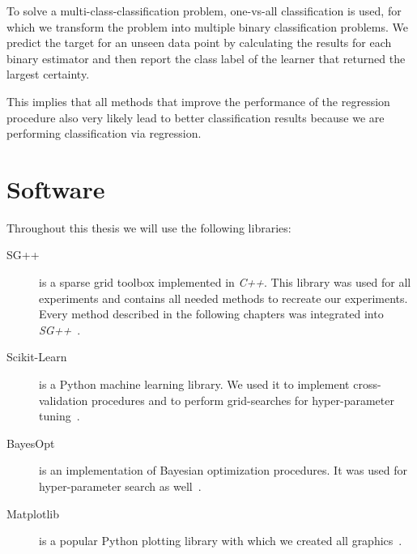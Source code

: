 To solve a multi-class-classification problem, one-vs-all classification is used, for which we transform the problem into multiple binary classification problems.
We predict the target for an unseen data point by calculating the results for
each binary estimator and then report the class label of the learner that returned the largest certainty.

This implies that all methods that improve the performance of the regression procedure also very likely lead to better classification results because we are performing classification via regression.

\section{Software}
Throughout this thesis we will use the following libraries:
\begin{description}
\item[SG++] is a sparse grid toolbox implemented in \emph{C++}. This library was used for all
  experiments and contains all needed methods to recreate our experiments.
  Every method described in the following chapters was integrated into
  \emph{SG++}~\cite{spatAdaptGrid}.
\item[Scikit-Learn] is a Python machine learning library.
  We used it to implement cross-validation procedures and to perform
  grid-searches for hyper-parameter tuning~\cite{software-sklearn}.
\item[BayesOpt] is an implementation of Bayesian optimization procedures.
  It was used for hyper-parameter search as well~\cite{software-bayesOpt}.
\item[Matplotlib] is a popular Python plotting library with which we created all
  graphics~\cite{software-matplotlib}.
\end{description}

